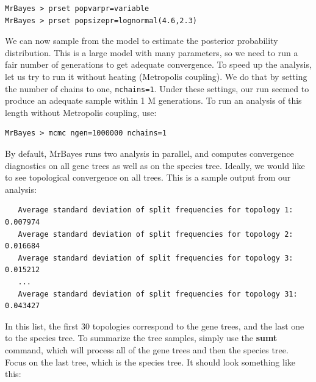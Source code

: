 \documentclass[12pt]{book}
\begin{document}
\begin{singlespacing}
\begin{verbatim}
MrBayes > prset popvarpr=variable
MrBayes > prset popsizepr=lognormal(4.6,2.3)
\end{verbatim}
\end{singlespacing}

We can now sample from the model to estimate the posterior probability distribution. This is a
large model with many parameters, so we need to run a fair number of generations to get adequate
convergence. To speed up the analysis, let us try to run it without heating (Metropolis coupling).
We do that by setting the number of chains to one, \texttt{nchains=1}. Under these settings, our
run seemed to produce an adequate sample within 1 M generations. To run an analysis of this length
without Metropolis coupling, use:

\begin{verbatim}
MrBayes > mcmc ngen=1000000 nchains=1
\end{verbatim}

By default, MrBayes runs two analysis in parallel, and computes convergence diagnostics on all gene
trees as well as on the species tree. Ideally, we would like to see topological convergence on all
trees. This is a sample output from our analysis:

\footnotesize
\begin{singlespacing}
\begin{verbatim}
   Average standard deviation of split frequencies for topology 1: 0.007974
   Average standard deviation of split frequencies for topology 2: 0.016684
   Average standard deviation of split frequencies for topology 3: 0.015212
   ...
   Average standard deviation of split frequencies for topology 31: 0.043427
\end{verbatim}
\end{singlespacing}
\normalsize

In this list, the first 30 topologies correspond to the gene trees, and the last one to the species
tree.  To summarize the tree samples, simply use the \textbf{sumt} command, which will process all
of the gene trees and then the species tree. Focus on the last tree, which is the species tree. It
should look something like this:
\end{document}
